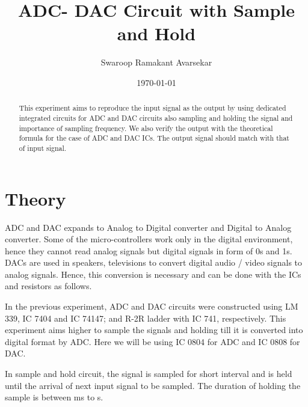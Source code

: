 \documentclass[a4paper, amsfonts, amssymb, amsmath, reprint, showkeys, nofootinbib, twoside]{revtex4-1}
\begin{document}
\title{ADC- DAC Circuit with Sample and Hold}
\author{Swaroop Ramakant Avarsekar}
\date{\today}


\begin{abstract}
This experiment aims to reproduce the input signal as the output by using dedicated integrated circuits for ADC and DAC circuits also sampling and holding the signal and importance of sampling frequency. We also verify the output with the theoretical formula for the case of ADC and DAC ICs. The output signal should match with that of input signal.
\end{abstract}
	
	
\maketitle

\section{Theory}
ADC and DAC expands to Analog to Digital converter and Digital to Analog converter. Some of the micro-controllers work only in the digital environment, hence they cannot read analog signals but digital signals in form of 0s and 1s. DACs are used in speakers, televisions to convert digital audio / video signals to analog signals. Hence, this conversion is necessary and can be done with the ICs and resistors as follows.

 In the previous experiment, ADC and DAC circuits were constructed using LM 339, IC 7404 and IC 74147; and R-2R ladder  with IC 741, respectively. This experiment aims higher to sample the signals and holding till it is converted into digital format by ADC. Here we will be using IC 0804 for ADC and IC 0808 for DAC. 
 
 In sample and hold circuit, the signal is sampled for short interval and is held until the arrival of next input signal to be sampled. The duration of holding the sample is between ms to s.
 
\end{document}
